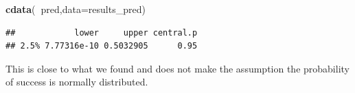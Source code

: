 \documentclass[
]{book}
\newenvironment{Shaded}{\begin{snugshade}}{\end{snugshade}}
\newcommand{\DataTypeTok}[1]{\textcolor[rgb]{0.13,0.29,0.53}{#1}}
\newcommand{\KeywordTok}[1]{\textcolor[rgb]{0.13,0.29,0.53}{\textbf{#1}}}
\newcommand{\NormalTok}[1]{#1}
\newcommand{\OperatorTok}[1]{\textcolor[rgb]{0.81,0.36,0.00}{\textbf{#1}}}
\begin{document}
\begin{Shaded}
\begin{Highlighting}[]
\KeywordTok{cdata}\NormalTok{(}\OperatorTok{~}\NormalTok{pred,}\DataTypeTok{data=}\NormalTok{results_pred)}
\end{Highlighting}
\end{Shaded}

\begin{verbatim}
##            lower     upper central.p
## 2.5% 7.77316e-10 0.5032905      0.95
\end{verbatim}

This is close to what we found and does not make the assumption the probability of success is normally distributed.

  
\end{document}
